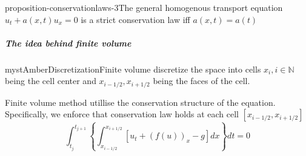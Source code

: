 \begin{mystthmproposition}{}{proposition-conservationlaws-3}The general homogenous transport equation $u_t+a(x,t)u_x=0$ is a strict conservation law iff $a(x,t)=a(t)$

\end{mystthmproposition}
\subparagraph{The idea behind finite volume}

\begin{mystadmonition}{mystAmber}{Discretization}Finite volume discretize the space into cells $x_i, i\in \mathbb{N}$ being the cell center and $x_{i -1/2},x_{i+1/2}$ being the faces of the cell.

\end{mystadmonition}
Finite volume method utillise the conservation structure of the equation. Specifically, we enforce that conservation law holds at each cell $[x_{i -1/2},x_{i+1/2}]$\newline
\begin{equation}
\int_{t_j}^{t_{j+1}}\left\{ \int_{x_{i-1/2}}^{x_{i+1/2}} \left[ u_t + (f(u))_x -g\right]dx \right\}dt=0
\end{equation}